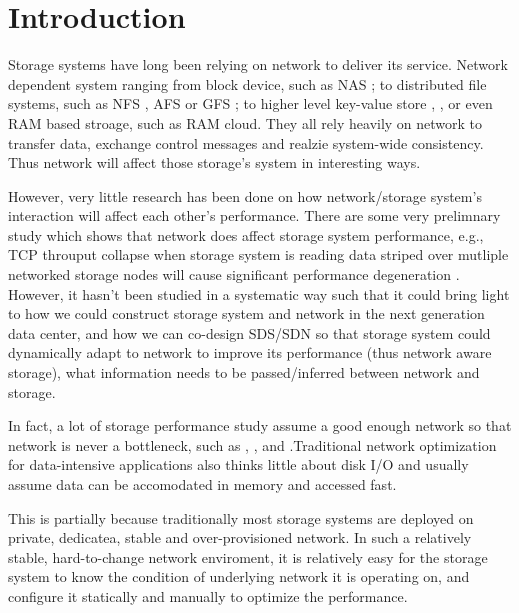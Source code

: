 \section{Introduction}
\label{section:intro}

Storage systems have long been relying on network to deliver its service. Network dependent system ranging from block device, such as NAS \cite{nas}; to distributed file systems, such as NFS \cite{nfs}, AFS \cite{afs} or GFS \cite{gfs}; to higher level key-value store \cite{dynamo}, \cite{big-table}, or even RAM based stroage, such as RAM cloud. They all rely heavily on network to transfer data, exchange control messages and realzie system-wide consistency. Thus network will affect those storage's system in interesting ways.

However, very little research has been done on how network/storage system's interaction will affect each other's performance. There are some very prelimnary study which shows that network does affect storage system performance, e.g., TCP throuput collapse when storage system is reading data striped over mutliple networked storage nodes will cause significant performance degeneration \cite{incast}.
 However, it hasn't been studied in a systematic way such that it could bring light to how we could construct storage system and network in the next generation data center, and how we can co-design SDS/SDN so that storage system could dynamically adapt to network to improve its performance (thus network aware storage), what information needs to be passed/inferred between network and storage. 


In fact, a lot of storage performance study assume a good enough network so that network is never a bottleneck, such as \cite{shedule-storage-system}, \cite{cloud-fair-storage}, and \cite{flat-datacenter-storage}.Traditional network optimization for data-intensive applications also thinks little about disk I/O and usually assume data can be accomodated in memory and accessed fast.

This is partially because traditionally most storage systems are deployed on private, dedicatea, stable and over-provisioned network.
 In such a relatively stable, hard-to-change network enviroment, it is relatively easy for the storage system to know the condition of underlying network it is operating on, and configure it statically and manually to optimize the performance.

